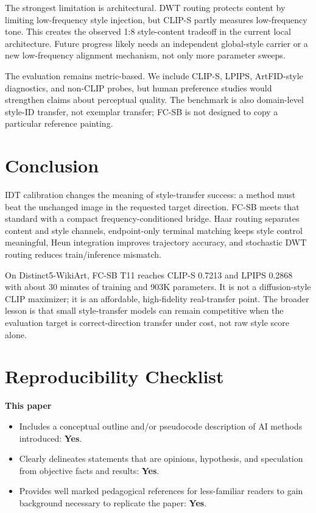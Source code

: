 \documentclass[letterpaper]{article}
\begin{document}
The strongest limitation is architectural. DWT routing protects content by limiting low-frequency style injection, but CLIP-S partly measures low-frequency tone. This creates the observed 1:8 style-content tradeoff in the current local architecture. Future progress likely needs an independent global-style carrier or a new low-frequency alignment mechanism, not only more parameter sweeps.

The evaluation remains metric-based. We include CLIP-S, LPIPS, ArtFID-style diagnostics, and non-CLIP probes, but human preference studies would strengthen claims about perceptual quality. The benchmark is also domain-level style-ID transfer, not exemplar transfer; FC-SB is not designed to copy a particular reference painting.

\section{Conclusion}
IDT calibration changes the meaning of style-transfer success: a method must beat the unchanged image in the requested target direction. FC-SB meets that standard with a compact frequency-conditioned bridge. Haar routing separates content and style channels, endpoint-only terminal matching keeps style control meaningful, Heun integration improves trajectory accuracy, and stochastic DWT routing reduces train/inference mismatch.

On Distinct5-WikiArt, FC-SB T11 reaches CLIP-S 0.7213 and LPIPS 0.2868 with about 30 minutes of training and 903K parameters. It is not a diffusion-style CLIP maximizer; it is an affordable, high-fidelity real-transfer point. The broader lesson is that small style-transfer models can remain competitive when the evaluation target is correct-direction transfer under cost, not raw style score alone.



\footnotesize
\setlength{\itemsep}{0pt}
\setlength{\parskip}{1pt}
\section*{Reproducibility Checklist}
\noindent\textbf{This paper}
\begin{itemize}
\item Includes a conceptual outline and/or pseudocode description of AI methods introduced: \textbf{Yes}.
\item Clearly delineates statements that are opinions, hypothesis, and speculation from objective facts and results: \textbf{Yes}.
\item Provides well marked pedagogical references for less-familiar readers to gain background necessary to replicate the paper: \textbf{Yes}.
\end{itemize}
\end{document}
